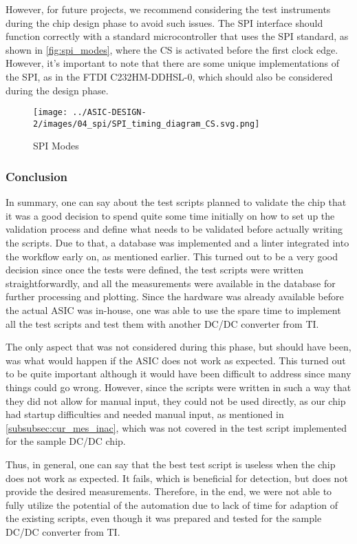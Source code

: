 However, for future projects, we recommend considering the test instruments during the chip design phase to avoid such issues. The SPI interface should function correctly with a standard microcontroller that uses the SPI standard, as shown in \autoref{fig:spi_modes}, where the CS is activated before the first clock edge. However, it's important to note that there are some unique implementations of the SPI, as in the FTDI C232HM-DDHSL-0, which should also be considered during the design phase.

\begin{figure}[h]
    \centering
    \texttt{[image: ../ASIC-DESIGN-2/images/04\_spi/SPI\_timing\_diagram\_CS.svg.png]}
    \caption{SPI Modes \cite{Wikipedia:SPI}}
    \label{fig:spi_modes}
\end{figure}
\subsubsection{Conclusion}
In summary, one can say about the test scripts planned to validate the chip that it was a good decision to spend quite some time initially on how to set up the validation process and define what needs to be validated before actually writing the scripts. Due to that, a database was implemented and a linter integrated into the workflow early on, as mentioned earlier. This turned out to be a very good decision since once the tests were defined, the test scripts were written straightforwardly, and all the measurements were available in the database for further processing and plotting. Since the hardware was already available before the actual \ac{ASIC} was in-house, one was able to use the spare time to implement all the test scripts and test them with another DC/DC converter from TI.

The only aspect that was not considered during this phase, but should have been, was what would happen if the \ac{ASIC} does not work as expected. This turned out to be quite important although it would have been difficult to address since many things could go wrong. However, since the scripts were written in such a way that they did not allow for manual input, they could not be used directly, as our chip had startup difficulties and needed manual input, as mentioned in \autoref{subsubsec:cur_mes_inac}, which was not covered in the test script implemented for the sample DC/DC chip. 

Thus, in general, one can say that the best test script is useless when the chip does not work as expected. It fails, which is beneficial for detection, but does not provide the desired measurements. Therefore, in the end, we were not able to fully utilize the potential of the automation due to lack of time for adaption of the existing scripts, even though it was prepared and tested for the sample DC/DC converter from TI.


